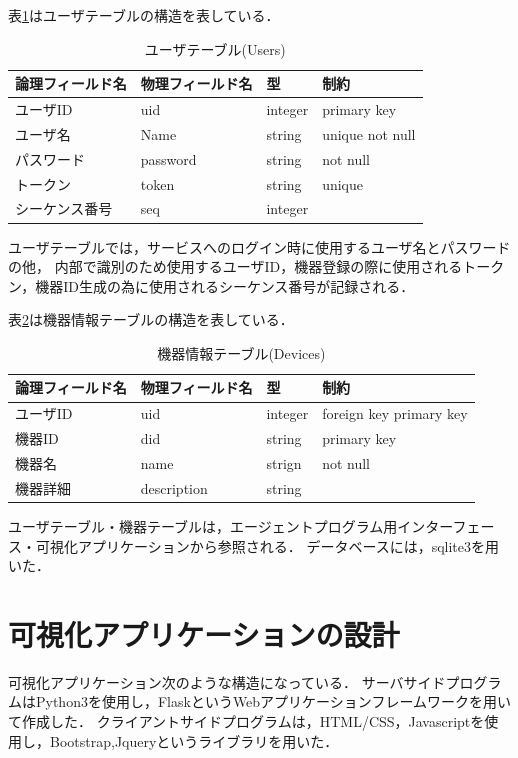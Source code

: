 表\ref{tab:users}はユーザテーブルの構造を表している．
\begin{table}[htb]
\begin{center}
\caption{ユーザテーブル(Users)}
\begin{tabular}{|l|l|l|l|} \hline
論理フィールド名 & 物理フィールド名 & 型 & 制約 \\ \hline \hline
ユーザID & uid & integer & primary key \\ \hline
ユーザ名 & Name & string & unique not null \\ \hline
パスワード & password & string & not null \\ \hline
トークン & token & string & unique \\ \hline
シーケンス番号 & seq & integer & \\ \hline
\end{tabular}
\label{tab:users}
\end{center}
\end{table}
ユーザテーブルでは，サービスへのログイン時に使用するユーザ名とパスワードの他，
内部で識別のため使用するユーザID，機器登録の際に使用されるトークン，機器ID生成の為に使用されるシーケンス番号が記録される．

表\ref{tab:devices}は機器情報テーブルの構造を表している．
\begin{table}[htb]
\begin{center}
\caption{機器情報テーブル(Devices)}
\begin{tabular}{|l|l|l|l|} \hline
論理フィールド名 & 物理フィールド名 & 型 & 制約 \\ \hline \hline
ユーザID & uid & integer & foreign key primary key \\ \hline
機器ID & did & string & primary key \\ \hline
機器名 & name & strign & not null \\ \hline
機器詳細 & description & string & \\ \hline
\end{tabular}
\label{tab:devices}
\end{center}
\end{table}

ユーザテーブル・機器テーブルは，エージェントプログラム用インターフェース・可視化アプリケーションから参照される．
データベースには，sqlite3を用いた．


\section{可視化アプリケーションの設計}
可視化アプリケーション次のような構造になっている．
サーバサイドプログラムはPython3を使用し，FlaskというWebアプリケーションフレームワークを用いて作成した．
クライアントサイドプログラムは，HTML/CSS，Javascriptを使用し，Bootstrap,Jqueryというライブラリを用いた．


